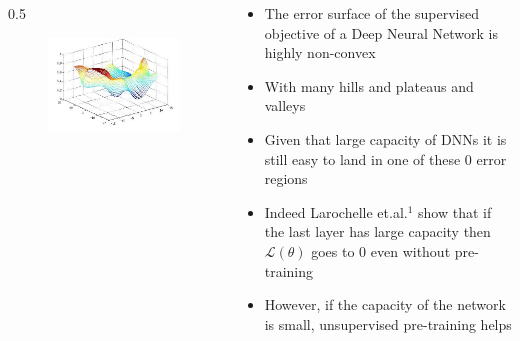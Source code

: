 \begin{frame}
	\begin{columns}
		\begin{column} {0.5\textwidth}
			\begin{figure}
				\includegraphics[scale= 0.4]{images/surface_.jpeg}
			\end{figure}
			
		\end{column}
		\begin{column}{0.5\textwidth}
			\begin{itemize}[<+->]
				\justifying
				\item The error surface of the supervised objective of a Deep Neural Network is highly non-convex
				\item With many hills and plateaus and valleys 
				\item Given that large capacity of DNNs it is still easy to land in one of these 0 error regions
				\item Indeed Larochelle et.al.$^1$ show that if the last layer has large capacity then $\displaystyle\mathscr{L (\theta)}$ goes to 0 even without pre-training
				\item However, if the capacity of the network is small, unsupervised pre-training helps
			\end{itemize}    
			
		\end{column}
		
	\end{columns}
\end{frame}

